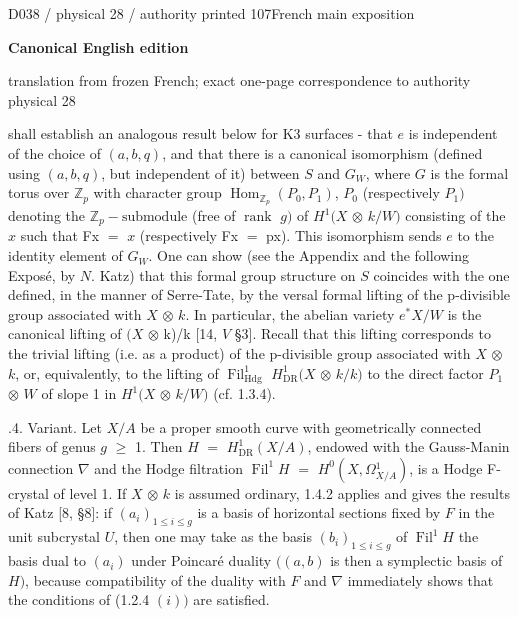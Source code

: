 \documentclass[9pt]{article}
\newcommand{\CanonText}[1]{\par{\fontsize{8.0}{9.35}\selectfont\RaggedRight #1\par}\vspace{2.2pt}}
\newcommand{\LayerTitle}{Canonical English edition}
\begin{document}
\noindent\begin{minipage}[t][\dimexpr\textheight-5pt\relax][t]{\textwidth}
{\sffamily\fontsize{7.3}{8.2}\selectfont\color{Quiet} D038 / physical 28 / authority printed 107\hfill French main exposition}
\par{}\vspace{4.5pt}
{\sffamily\fontsize{10.4}{11.6}\selectfont\bfseries\color{Accent} \LayerTitle}
\par{\sffamily\fontsize{6.7}{7.7}\selectfont\color{Quiet} translation from frozen French; exact one-page correspondence to authority physical 28}
\vspace{5pt}
\CanonText{shall establish an analogous result below for K3 surfaces - that \(e\) is independent of the choice of \((a,b,q)\), and that there is a canonical isomorphism (defined using \((a,b,q)\), but independent of it) between \(S\) and \(G_{W}\), where \(G\) is the formal torus over \(\mathbb{Z}_{p}\) with character group \(\operatorname{Hom}_{\mathbb{Z}_{p}}(P_{0},P_{1})\), \(P_{0}\) (respectively \(P_{1})\) denoting the \(\mathbb{Z}_{p}-\text{submodule}\) (free of \(\operatorname{rank}\) \(g)\) of \(H^{1}(X\) \(\otimes{}\) \(k/W)\) consisting of the \(x\) such that Fx \(=\) \(x\) (respectively Fx \(=\) px). This isomorphism sends \(e\) to the identity element of \(G_{W}\). One can show (see the Appendix and the following Exposé, by \(N\). Katz) that this formal group structure on \(S\) coincides with the one defined, in the manner of Serre-Tate, by the versal formal lifting of the p-divisible group associated with \(X\) \(\otimes{}\) \(k\). In particular, the abelian variety \(e^{*}X/W\) is the canonical lifting of \((X\) \(\otimes{}\) k)/k [14, \(V\) §3]. Recall that this lifting corresponds to the trivial lifting (i.e. as a product) of the p-divisible group associated with \(X\) \(\otimes{}\) \(k\), or, equivalently, to the lifting of \(\operatorname{Fil}^{1}_{\mathrm{Hdg}}\) \(H^{1}_{\mathrm{DR}}(X\) \(\otimes{}\) \(k/k)\) to the direct factor \(P_{1}\) \(\otimes{}\) \(W\) of slope 1 in \(H^{1}(X\) \(\otimes{}\) \(k/W)\) (cf. 1.3.4).}
\CanonText{2.1.4. Variant. Let \(X/A\) be a proper smooth curve with geometrically connected fibers of genus \(g\) \(\geq{}\) 1. Then \(H\) \(=\) \(H^{1}_{\mathrm{DR}}(X/A)\), endowed with the Gauss-Manin connection \(\nabla{}\) and the Hodge filtration \(\operatorname{Fil}^{1}H\) \(=\) \(H^{0}(X,\Omega{}^{1}_{X/A})\), is a Hodge F-crystal of level 1. If \(X\) \(\otimes{}\) \(k\) is assumed ordinary, 1.4.2 applies and gives the results of Katz [8, §8]: if \((a_{i})_{1\leq{}i\leq{}g}\) is a basis of horizontal sections fixed by \(F\) in the unit subcrystal \(U\), then one may take as the basis \((b_{i})_{1\leq{}i\leq{}g}\) of \(\operatorname{Fil}^{1}H\) the basis dual to \((a_{i})\) under Poincaré duality \(((a,b)\) is then a symplectic basis of \(H)\), because compatibility of the duality with \(F\) and \(\nabla{}\) immediately shows that the conditions of (1.2.4 \((i))\) are satisfied.}

\end{minipage}
\end{document}
